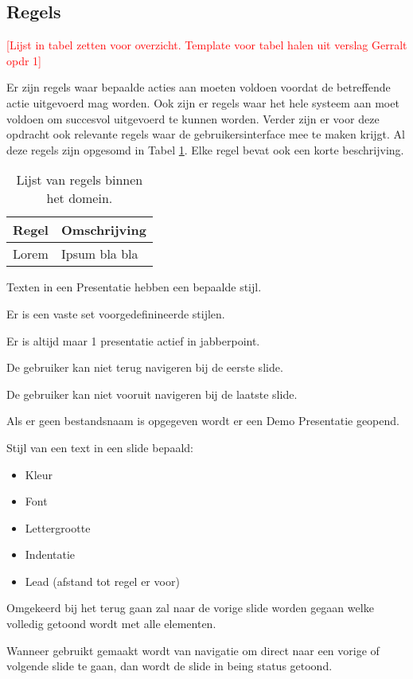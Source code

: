 \documentclass[a4paper]{article}
\newcommand{\todo}[1]{\textcolor{red}{[#1]}}
\begin{document}
\subsection{Regels}
\todo{Lijst in tabel zetten voor overzicht. Template voor tabel halen uit verslag Gerralt opdr 1}

Er zijn regels waar bepaalde acties aan moeten voldoen voordat de betreffende actie uitgevoerd mag worden. Ook zijn er regels waar het hele systeem aan moet voldoen om succesvol uitgevoerd te kunnen worden. Verder zijn er voor deze opdracht ook relevante regels waar de gebruikersinterface mee te maken krijgt. Al deze regels zijn opgesomd in Tabel \ref{table:regels}. Elke regel bevat ook een korte beschrijving.

\begin{table}[!h]
\centering
	\begin{tabular}{ll}
	\toprule
 	Regel & Omschrijving \\ \midrule
 	Lorem & Ipsum bla bla \\
  	\bottomrule
	\end{tabular}
\caption{Lijst van regels binnen het domein.}
\label{table:regels}
\end{table}


Texten in een Presentatie hebben een bepaalde stijl.

Er is een vaste set voorgedefinineerde stijlen.

Er is altijd maar 1 presentatie actief in jabberpoint.

De gebruiker kan niet terug navigeren bij de eerste slide.

De gebruiker kan niet vooruit navigeren bij de laatste slide.

Als er geen bestandsnaam is opgegeven wordt er een Demo Presentatie geopend.

Stijl van een text in een slide bepaald:
\begin{itemize}
    \item Kleur
    \item Font
    \item Lettergrootte
    \item Indentatie
    \item Lead (afstand tot regel er voor)
\end{itemize}

Omgekeerd bij het terug gaan zal naar de vorige slide worden gegaan welke
volledig getoond wordt met alle elementen.

Wanneer gebruikt gemaakt wordt van navigatie om direct naar een vorige of
volgende slide te gaan, dan wordt de slide in being status getoond.
\end{document}
